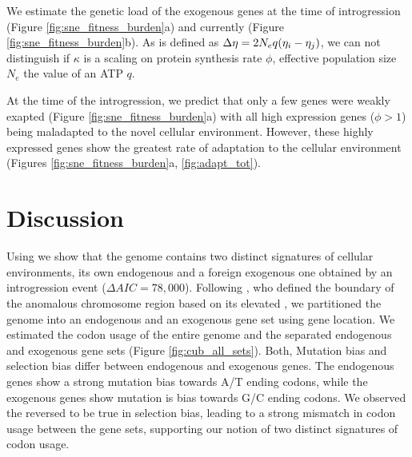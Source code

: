 \documentclass[12pt]{article}
\begin{document}
We estimate the genetic load of the exogenous genes at the time of introgression (Figure \ref{fig:sne_fitness_burden}a) and currently (Figure \ref{fig:sne_fitness_burden}b).
As \DE is defined as ${\Delta \eta} = 2N_eq(\eta_i-\eta_j)$, we can not distinguish if $\kappa$ is a scaling on protein synthesis rate $\phi$, effective population size $N_e$ the value of an ATP $q$\citep{gilchrist2015}.

At the time of the introgression, we predict that only a few genes were weakly exapted (Figure \ref{fig:sne_fitness_burden}a) with all high expression genes ($\phi > 1$) being maladapted to the novel cellular environment.
However, these highly expressed genes show the greatest rate of adaptation to the \kluyveri cellular environment (Figures \ref{fig:sne_fitness_burden}a, \ref{fig:adapt_tot}).

\section*{Discussion}
Using \ROC we show that the \kluyveri genome contains two distinct signatures of cellular environments, its own endogenous and a foreign exogenous one obtained by an introgression event ($\Delta AIC = 78,000$).
Following \citet{payen2009}, who defined the boundary of the anomalous chromosome region based on its elevated \GC, we partitioned the \kluyveri genome into an endogenous and an exogenous gene set using gene location.
We estimated the codon usage of the entire \kluyveri genome and the separated endogenous and exogenous gene sets (Figure \ref{fig:cub_all_sets}).
Both, Mutation bias and selection bias differ between endogenous and exogenous genes.
The endogenous genes show a strong mutation bias towards A/T ending codons, while the exogenous genes show mutation is bias towards G/C ending codons.
We observed the reversed to be true in selection bias, leading to a strong mismatch in codon usage between the gene sets, supporting our notion of two distinct signatures of codon usage.
\end{document}
